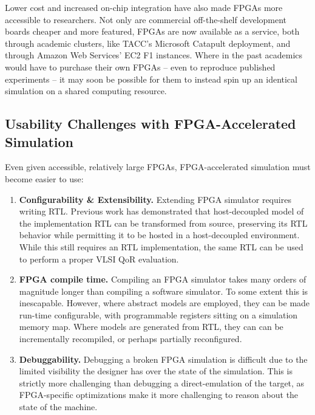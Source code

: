 Lower cost and increased on-chip integration have also made FPGAs more
accessible to researchers.  Not only are commercial off-the-shelf development
boards cheaper and more featured, FPGAs are now available as a service, both
through academic clusters, like TACC's Microsoft
Catapult\cite{catapultannounce} deployment, and through Amazon Web Services'
EC2 F1 instances\cite{amazonf1}. Where in the past academics would have to
purchase their own FPGAs -- even to reproduce published experiments -- it may
soon be possible for them to instead spin up an identical simulation on a
shared computing resource.

\subsection{Usability Challenges with FPGA-Accelerated Simulation}

Even given accessible, relatively large FPGAs, FPGA-accelerated simulation must
become easier to use:

\begin{enumerate}
    \item \textbf{Configurability \& Extensibility.} Extending FPGA simulator
        requires writing RTL.
        Previous work\cite{fabscalarfpga, strober} has demonstrated that
        host-decoupled model of the implementation RTL can be transformed from
        source, preserving its RTL behavior while permitting it to be hosted
        in a host-decoupled environment. While this still requires an RTL
        implementation, the same RTL can be used to perform a proper VLSI QoR
        evaluation.

    \item \textbf{FPGA compile time.} Compiling an FPGA simulator takes many
        orders of magnitude longer than compiling a software simulator.
        To some extent this is inescapable. However, where abstract models are
        employed, they can be made run-time configurable, with programmable
        registers sitting on a simulation memory map. Where models are
        generated from RTL, they can can be incrementally recompiled, or perhaps
        partially reconfigured.

    \item \textbf{Debuggability.} Debugging a broken FPGA simulation is
        difficult due to the limited visibility the designer has over the state
        of the simulation. This is strictly more challenging than debugging a
        direct-emulation of the target, as FPGA-specific optimizations make it more
        challenging to reason about the state of the machine.

\end{enumerate}

